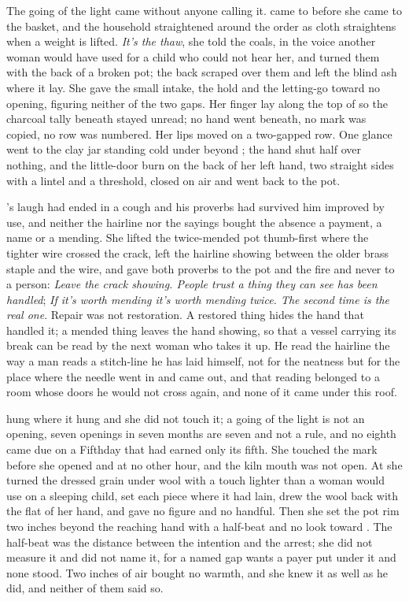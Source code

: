 \scenebreak

The going of the light came without anyone calling it.  came to  before she came to the basket, and the household straightened around the order as cloth straightens when a weight is lifted. \emph{It's the thaw}, she told the coals, in the voice another woman would have used for a child who could not hear her, and turned them with the back of a broken pot; the back scraped over them and left the blind ash where it lay. She gave the small intake, the hold and the letting-go toward no opening, figuring neither of the two gaps. Her finger lay along the top of  so the charcoal tally beneath stayed unread; no hand went beneath, no mark was copied, no row was numbered. Her lips moved on a two-gapped row. One glance went to the clay jar standing cold under  beyond ; the hand shut half over nothing, and the little-door burn on the back of her left hand, two straight sides with a lintel and a threshold, closed on air and went back to the pot.

's laugh had ended in a cough and his proverbs had survived him improved by use, and neither the hairline nor the sayings bought the absence a payment, a name or a mending. She lifted the twice-mended pot thumb-first where the tighter wire crossed the crack, left the hairline showing between the older brass staple and the wire, and gave both proverbs to the pot and the fire and never to a person: \emph{Leave the crack showing. People trust a thing they can see has been handled}; \emph{If it's worth mending it's worth mending twice. The second time is the real one}. Repair was not restoration. A restored thing hides the hand that handled it; a mended thing leaves the hand showing, so that a vessel carrying its break can be read by the next woman who takes it up. He read the hairline the way a man reads a stitch-line he has laid himself, not for the neatness but for the place where the needle went in and came out, and that reading belonged to a room whose doors he would not cross again, and none of it came under this roof.

 hung where it hung and she did not touch it; a going of the light is not an opening, seven openings in seven months are seven and not a rule, and no eighth came due on a Fifthday that had earned only its fifth. She touched the mark before she opened  and at no other hour, and the kiln mouth was not open. At  she turned the dressed grain under wool with a touch lighter than a woman would use on a sleeping child, set each piece where it had lain, drew the wool back with the flat of her hand, and gave no figure and no handful. Then she set the pot rim two inches beyond the reaching hand with a half-beat and no look toward . The half-beat was the distance between the intention and the arrest; she did not measure it and did not name it, for a named gap wants a payer put under it and none stood. Two inches of air bought no warmth, and she knew it as well as he did, and neither of them said so.

